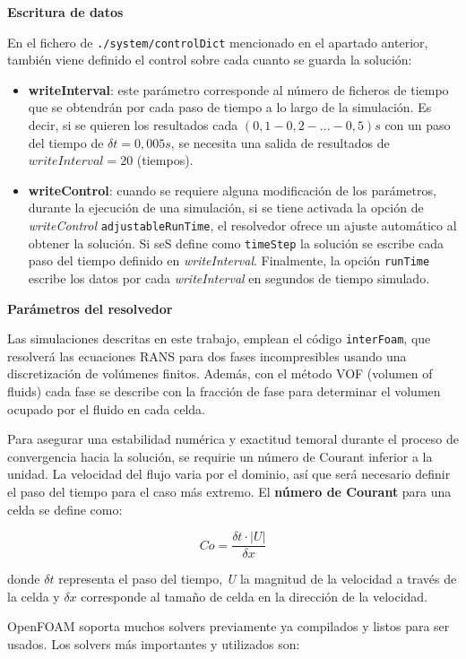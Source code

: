 \textbf{Escritura de datos}

En el fichero de \lstinline[style=bash]{./system/controlDict}
mencionado en el apartado anterior, también viene definido el control
sobre cada cuanto se guarda la solución:

\begin{itemize}
\item
  \textbf{writeInterval}: este parámetro corresponde al número de
  ficheros de tiempo que se obtendrán por cada paso de tiempo a lo largo
  de la simulación. Es decir, si se quieren los resultados cada
  \((0,1-0,2-...-0,5)s\) con un paso del tiempo de \(\delta t=0,005s\),
  se necesita una salida de resultados de \(writeInterval=20\)
  (tiempos).
\item
  \textbf{writeControl}: cuando se requiere alguna modificación de los
  parámetros, durante la ejecución de una simulación, si se tiene
  activada la opción de \emph{writeControl} \texttt{adjustableRunTime},
  el resolvedor ofrece un ajuste automático al obtener la solución. Si
  seS define como \texttt{timeStep} la solución se escribe cada paso del
  tiempo definido en \emph{writeInterval}. Finalmente, la opción
  \texttt{runTime} escribe los datos por cada \emph{writeInterval} en
  segundos de tiempo simulado.
\end{itemize}

\textbf{Parámetros del resolvedor}

Las simulaciones descritas en este trabajo, emplean el código
\texttt{interFoam}, que resolverá las ecuaciones RANS para dos fases
incompresibles usando una discretización de volúmenes finitos. Además,
con el método VOF (volumen of fluids) cada fase se describe con la
fracción de fase para determinar el volumen ocupado por el fluido en
cada celda.

Para asegurar una estabilidad numérica y exactitud temoral durante el
proceso de convergencia hacia la solución, se requirie un número de
Courant inferior a la unidad. La velocidad del flujo varia por el
dominio, así que será necesario definir el paso del tiempo para el caso
más extremo. El \textbf{número de Courant} para una celda se define
como:

\[Co=\frac{\delta t \cdot |U|}{\delta x}\]

donde \(\delta t\) representa el paso del tiempo,
\textbar{}\emph{U}\textbar{} la magnitud de la velocidad a través de la
celda y \(\delta x\) corresponde al tamaño de celda en la dirección de
la velocidad.

OpenFOAM soporta muchos solvers previamente ya compilados y listos para
ser usados. Los solvers más importantes y utilizados son:

